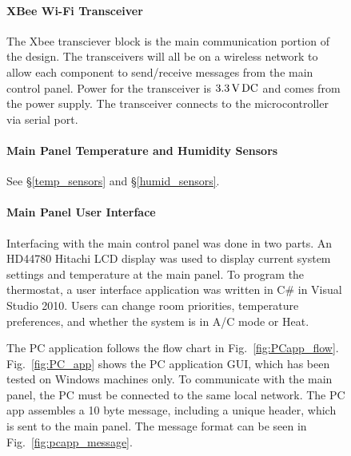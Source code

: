\begin{figure}
\paragraph{XBee Wi-Fi Transceiver}
The Xbee transciever block is the main communication portion of the design. The transceivers will all be on a wireless network to allow each component to send/receive messages from the main control panel. Power for the transceiver is $3.3\mbox{\,V\,DC}$ and comes from the power supply. The transceiver connects to the microcontroller via serial port.

\paragraph{Main Panel Temperature and Humidity Sensors}
See \S\ref{temp_sensors} and \S\ref{humid_sensors}.

\paragraph{Main Panel User Interface}
Interfacing with the main control panel was done in two parts. An HD44780 Hitachi LCD display was used to display current system settings and temperature at the main panel. To program the thermostat, a user interface application was written in C\# in Visual Studio 2010. Users can change room priorities, temperature preferences, and whether the system is in A/C mode or Heat. 

The PC application follows the flow chart in Fig.~\ref{fig:PCapp_flow}. Fig.~\ref{fig:PC_app} shows the PC application GUI, which has been tested on Windows machines only.  To communicate with the main panel, the PC must be connected to the same local network.  The PC app assembles a 10 byte message, including a unique header, which is sent to the main panel.  The message format can be seen in Fig.~\ref{fig:pcapp_message}.


\end{figure}
